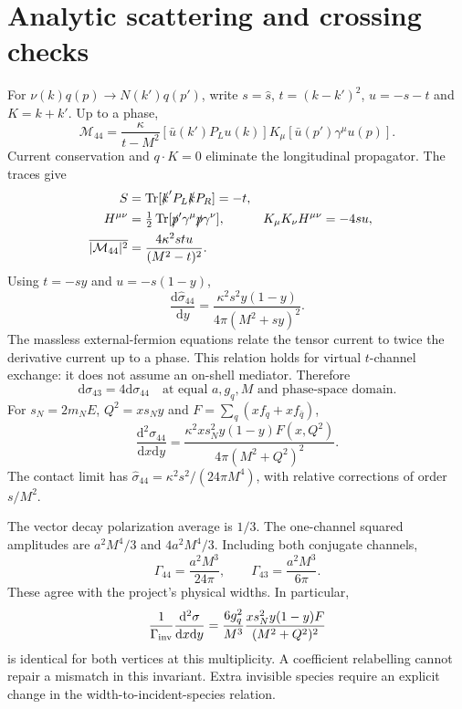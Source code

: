 \documentclass[11pt,a4paper]{article}
\newcommand{\PL}{P_L}
\newcommand{\dd}{\mathrm{d}}
\begin{document}
\section{Analytic scattering and crossing checks}
For $\nu(k)q(p)\to N(k')q(p')$, write $s=\hat s$, $t=(k-k')^2$,
$u=-s-t$ and $K=k+k'$. Up to a phase,
\begin{equation}
 \mathcal M_{44}=\frac{\kappa}{t-M^2}
 [\bar u(k')\PL u(k)]K_\mu[\bar u(p')\gamma^\mu u(p)].
\end{equation}
Current conservation and $q\cdot K=0$ eliminate the longitudinal propagator.
The traces give
\begin{align}
 S&=\operatorname{Tr}[\slashed k'\PL\slashed k P_R]=-t,\\
 H^{\mu\nu}&=\tfrac12\operatorname{Tr}[\slashed p'\gamma^\mu\slashed p\gamma^\nu],
 &K_\mu K_\nu H^{\mu\nu}&=-4su,\\
 \overline{|\mathcal M_{44}|^2}&=\frac{4\kappa^2stu}{(M^2-t)^2}.
\end{align}
Using $t=-sy$ and $u=-s(1-y)$,
\begin{equation}
 \frac{\dd\hat\sigma_{44}}{\dd y}
 =\frac{\kappa^2s^2y(1-y)}{4\pi(M^2+sy)^2}.
\end{equation}
The massless external-fermion equations relate the tensor current to twice
the derivative current up to a phase. This relation holds for virtual
$t$-channel exchange: it does not assume an on-shell mediator. Therefore
\begin{equation}
 \dd\sigma_{43}=4\dd\sigma_{44}
 \quad\text{at equal }a,g_q,M\text{ and phase-space domain}.
\end{equation}
For $s_N=2m_NE$, $Q^2=xs_Ny$ and $F=\sum_q(xf_q+xf_{\bar q})$,
\begin{equation}
 \frac{\dd^2\sigma_{44}}{\dd x\dd y}
 =\frac{\kappa^2x s_N^2 y(1-y)F(x,Q^2)}{4\pi(M^2+Q^2)^2}.
 \label{eq:fold}
\end{equation}
The contact limit has $\hat\sigma_{44}=\kappa^2s^2/(24\pi M^4)$,
with relative corrections of order $s/M^2$.

The vector decay polarization average is $1/3$. The one-channel squared
amplitudes are $a^2M^4/3$ and $4a^2M^4/3$. Including both conjugate channels,
\begin{equation}
 \Gamma_{44}=\frac{a^2M^3}{24\pi},\qquad
 \Gamma_{43}=\frac{a^2M^3}{6\pi}.
\end{equation}
These agree with the project's physical widths. In particular,
\begin{equation}
 \frac{1}{\Gamma_{\rm inv}}\frac{\dd^2\sigma}{\dd x\dd y}
 =\frac{6g_q^2}{M^3}\frac{x s_N^2y(1-y)F}{(M^2+Q^2)^2}
 \label{eq:invariant}
\end{equation}
is identical for both vertices at this multiplicity. A coefficient relabelling
cannot repair a mismatch in this invariant. Extra invisible species require
an explicit change in the width-to-incident-species relation.
\end{document}
